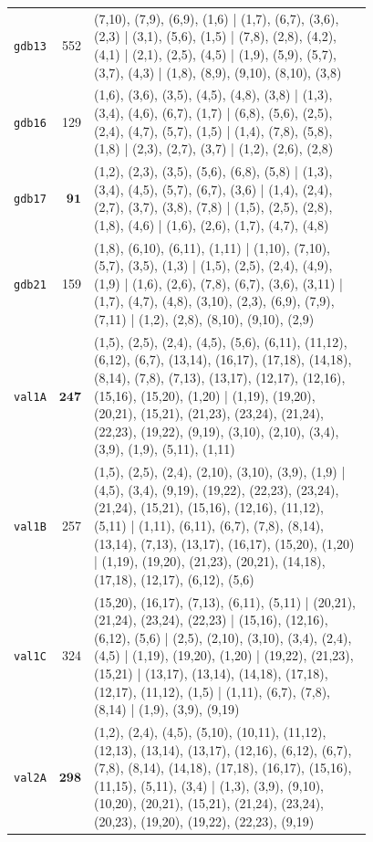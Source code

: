 \begin{landscape}
\begin{longtable}{lr>{\tiny\raggedright\arraybackslash}p{0.78\linewidth}}
\texttt{gdb13} & 552 & (7,10), (7,9), (6,9), (1,6) | (1,7), (6,7), (3,6), (2,3) | (3,1), (5,6), (1,5) | (7,8), (2,8), (4,2), (4,1) | (2,1), (2,5), (4,5) | (1,9), (5,9), (5,7), (3,7), (4,3) | (1,8), (8,9), (9,10), (8,10), (3,8) \\[2pt]
\texttt{gdb16} & 129 & (1,6), (3,6), (3,5), (4,5), (4,8), (3,8) | (1,3), (3,4), (4,6), (6,7), (1,7) | (6,8), (5,6), (2,5), (2,4), (4,7), (5,7), (1,5) | (1,4), (7,8), (5,8), (1,8) | (2,3), (2,7), (3,7) | (1,2), (2,6), (2,8) \\[2pt]
\texttt{gdb17} & $\mathbf{91}$ & (1,2), (2,3), (3,5), (5,6), (6,8), (5,8) | (1,3), (3,4), (4,5), (5,7), (6,7), (3,6) | (1,4), (2,4), (2,7), (3,7), (3,8), (7,8) | (1,5), (2,5), (2,8), (1,8), (4,6) | (1,6), (2,6), (1,7), (4,7), (4,8) \\[2pt]
\texttt{gdb21} & 159 & (1,8), (6,10), (6,11), (1,11) | (1,10), (7,10), (5,7), (3,5), (1,3) | (1,5), (2,5), (2,4), (4,9), (1,9) | (1,6), (2,6), (7,8), (6,7), (3,6), (3,11) | (1,7), (4,7), (4,8), (3,10), (2,3), (6,9), (7,9), (7,11) | (1,2), (2,8), (8,10), (9,10), (2,9) \\[2pt]
\texttt{val1A} & $\mathbf{247}$ & (1,5), (2,5), (2,4), (4,5), (5,6), (6,11), (11,12), (6,12), (6,7), (13,14), (16,17), (17,18), (14,18), (8,14), (7,8), (7,13), (13,17), (12,17), (12,16), (15,16), (15,20), (1,20) | (1,19), (19,20), (20,21), (15,21), (21,23), (23,24), (21,24), (22,23), (19,22), (9,19), (3,10), (2,10), (3,4), (3,9), (1,9), (5,11), (1,11) \\[2pt]
\texttt{val1B} & 257 & (1,5), (2,5), (2,4), (2,10), (3,10), (3,9), (1,9) | (4,5), (3,4), (9,19), (19,22), (22,23), (23,24), (21,24), (15,21), (15,16), (12,16), (11,12), (5,11) | (1,11), (6,11), (6,7), (7,8), (8,14), (13,14), (7,13), (13,17), (16,17), (15,20), (1,20) | (1,19), (19,20), (21,23), (20,21), (14,18), (17,18), (12,17), (6,12), (5,6) \\[2pt]
\texttt{val1C} & 324 & (15,20), (16,17), (7,13), (6,11), (5,11) | (20,21), (21,24), (23,24), (22,23) | (15,16), (12,16), (6,12), (5,6) | (2,5), (2,10), (3,10), (3,4), (2,4), (4,5) | (1,19), (19,20), (1,20) | (19,22), (21,23), (15,21) | (13,17), (13,14), (14,18), (17,18), (12,17), (11,12), (1,5) | (1,11), (6,7), (7,8), (8,14) | (1,9), (3,9), (9,19) \\[2pt]
\texttt{val2A} & $\mathbf{298}$ & (1,2), (2,4), (4,5), (5,10), (10,11), (11,12), (12,13), (13,14), (13,17), (12,16), (6,12), (6,7), (7,8), (8,14), (14,18), (17,18), (16,17), (15,16), (11,15), (5,11), (3,4) | (1,3), (3,9), (9,10), (10,20), (20,21), (15,21), (21,24), (23,24), (20,23), (19,20), (19,22), (22,23), (9,19) \\[2pt]

\end{longtable}
\end{landscape}
